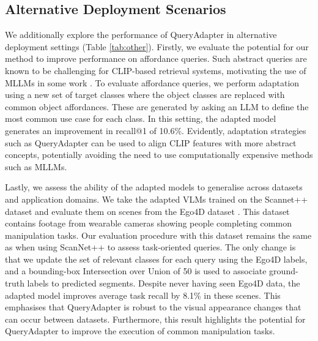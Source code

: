 \vspace{-0.3em}
\subsection{Alternative Deployment Scenarios}
We additionally explore the performance of QueryAdapter in alternative deployment settings (Table \ref{tab:other}). Firstly, we evaluate the potential for our method to improve performance on affordance queries. Such abstract queries are known to be challenging for CLIP-based retrieval systems, motivating the use of MLLMs in some work \cite{conceptgraphs}. To evaluate affordance queries, we perform adaptation using a new set of target classes where the object classes are replaced with common object affordances. These are generated by asking an LLM to define the most common use case for each class.
In this setting, the adapted model generates an improvement in recall@1 of 10.6\%. Evidently, adaptation strategies such as QueryAdapter can be used to align CLIP features with more abstract concepts, potentially avoiding the need to use computationally expensive methods such as MLLMs.   

Lastly, we assess the ability of the adapted models to generalise across datasets and application domains. We take the adapted VLMs trained on the Scannet++ dataset and evaluate them on scenes from the Ego4D dataset \cite{ego4d, paco}. This dataset contains footage from wearable cameras showing people completing common manipulation tasks. Our evaluation procedure with this dataset remains the same as when using ScanNet++ to assess task-oriented queries. The only change is that we update the set of relevant classes for each query using the Ego4D labels, and a bounding-box Intersection over Union of 50 is used to associate ground-truth labels to predicted segments. Despite never having seen Ego4D data, the adapted model improves average task recall by 8.1\% in these scenes. This emphasises that QueryAdapter is robust to the visual appearance changes that can occur between datasets. Furthermore, this result highlights the potential for QueryAdapter to improve the execution of common manipulation tasks.

\vspace{-0.5em}
